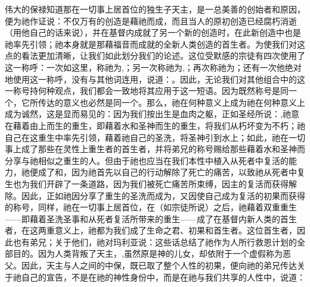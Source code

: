 伟大的保禄知道那在一切事上居首位的独生子天主，是一总美善的创始者和原因，便为祂作证说：不仅万有的创造是藉祂而成，而且当人的原初创造已经腐朽消逝（用他自己的话来说），并在基督内成就了另一个新的创造时，在此新创造中也是祂率先引领；祂本身就是那藉福音而成就的全新人类创造的首生者。\newline{}为使我们对这点的看法更加清晰，让我们如此划分我们的论述。\newline{}这位受默感的宗徒有四次使用了这一称呼：一次如这里，称祂为,；另一次称祂为,；再次称祂为；还有一次他绝对地使用这一称呼，没有与其他词连用，说道：。\newline{}因此，无论我们对其他组合中的这一称号持何种观点，我们都会一致地将其应用于这一短语。\newline{}因为既然称号是同一个，它所传达的意义也必然是同一个。\newline{}那么，祂在何种意义上成为祂在何种意义上成为\newline{}诚然，这是显而易见的：因为我们按出生是血肉之躯，正如圣经所说：,祂意在藉着由上而生的重生，即藉着水和圣神而生的重生，将我们从朽坏变为不朽；祂自己在这重生中率先引领，藉着祂自己的圣洗，将圣神引到水上；如此，祂在一切事上成了那些在灵性上重生者的首生者，并将弟兄的称号赐给那些藉着水和圣神而分享与祂相似之重生的人。\newline{}但由于祂也应当在我们本性中植入从死者中复活的能力，祂便成了和，因为祂首先以自己的行动解除了死亡的痛苦，以致祂从死者中复生也为我们开辟了一条道路，因为我们被死亡痛苦所束缚，因主的复活而获得解除。\newline{}因此，正如祂因分享了重生的圣洗而成为，又因使自己成为复活的初果而获得的称号，同样，祂在一切事上居首位，在（如宗徒所说）之后，祂藉着双重重生——即藉着圣洗圣事和从死者复活所带来的重生——成了在基督内新人类的首生者，在这两重意义上，祂都为我们成了生命之君、初果和首生者。\newline{}这位首生者，因此也有弟兄；关于他们，祂对玛利亚说：这些话总结了祂作为人所行救恩计划的全部目的。因为人类背叛了天主，,虽然原是神的儿女，却依附于一个虚假称为恶父。因此，天主与人之间的中保，既已取了整个人性的初果，便向祂的弟兄传达关于祂自己的宣告，不是在祂的神性身份中，而是在祂与我们共享的人性中，说道：\par

